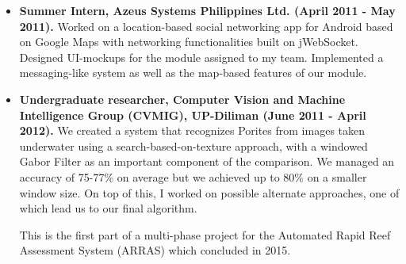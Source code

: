 \documentclass{article}
\begin{document}
\begin{itemize}

      \item \textbf{Summer Intern, Azeus Systems Philippines Ltd. (April 2011 - May 2011).} Worked on a
      location-based social networking app for Android based on Google Maps with networking functionalities built
      on jWebSocket. Designed UI-mockups for the module assigned to my team. Implemented a
      messaging-like system as well as the map-based features of our module.

   \end{itemize}

    \begin{itemize}
      \item \textbf{Undergraduate researcher, Computer Vision and Machine Intelligence Group (CVMIG), UP-Diliman
      (June 2011 - April 2012).} We created a system that recognizes Porites from images taken
      underwater using a search-based-on-texture approach, with a windowed Gabor Filter as an important component
      of the comparison. We managed an accuracy of 75-77\% on average but we achieved up to 80\% on a smaller
      window size. On top of this, I worked on possible alternate approaches, one of which lead us to our final
      algorithm.

      This is the first part of a multi-phase project for the Automated Rapid Reef Assessment System (ARRAS) which
      concluded in 2015.

    \end{itemize}
\end{document}

